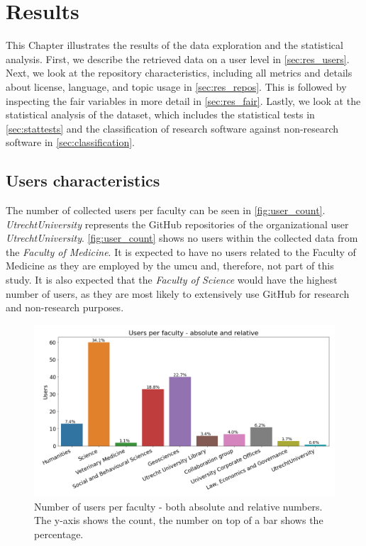 \chapter{Results}
\label{chap:results}
This Chapter illustrates the results of the data exploration and the statistical analysis. First, we describe the retrieved data on a user level in \autoref{sec:res_users}. Next, we look at the repository characteristics, including all metrics and details about license, language, and topic usage in \autoref{sec:res_repos}. This is followed by inspecting the \acrshort{fair} variables in more detail in \autoref{sec:res_fair}. Lastly, we look at the statistical analysis of the dataset, which includes the statistical tests in \autoref{sec:stattests} and the classification of research software against non-research software in \autoref{sec:classification}.

\section{Users characteristics}
\label{sec:res_users}
The number of collected users per faculty can be seen in \autoref{fig:user_count}. \textit{UtrechtUniversity} represents the GitHub repositories of the organizational user \textit{UtrechtUniversity}. \autoref{fig:user_count} shows no users within the collected data from the \textit{Faculty of Medicine}. It is expected to have no users related to the Faculty of Medicine as they are employed by the \acrshort{umcu} and, therefore, not part of this study. It is also expected that the \textit{Faculty of Science} would have the highest number of users, as they are most likely to extensively use GitHub for research and non-research purposes. 

\begin{figure}[h!]
\centerline{
\includegraphics[scale=0.5]{figures_results/user_count.png}}
\caption{Number of users per faculty - both absolute and relative numbers. The y-axis shows the count, the number on top of a bar shows the percentage.
\label{fig:user_count}}
\end{figure}



